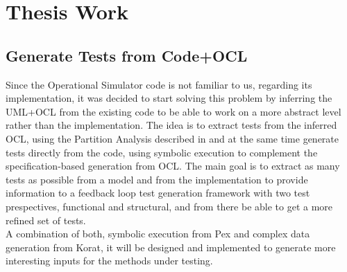 \chapter{Thesis Work}
\minitoc

\section{Generate Tests from Code+OCL}\label{proposal}
Since the Operational Simulator code is not familiar to us, regarding its implementation, it was decided to start solving this problem by inferring the UML+OCL from the existing code
to be able to work on a more abstract level rather than the implementation.
The idea is to extract tests from the inferred OCL, using the Partition Analysis described
in \cite{Benattou02generatingtest} and at the same time generate tests directly from the code, using symbolic execution to complement
the specification-based generation from OCL. The main goal is to extract as many tests as possible from a model and from the implementation 
to provide information to a feedback loop\cite{Xie03mutuallyenhancing}
test generation framework with two test prespectives, functional and structural, and from there be able to get a more refined set of tests.\\
A combination of both, symbolic execution from Pex and complex data generation from Korat, it will be designed and implemented to
generate more interesting inputs for the methods under testing.


